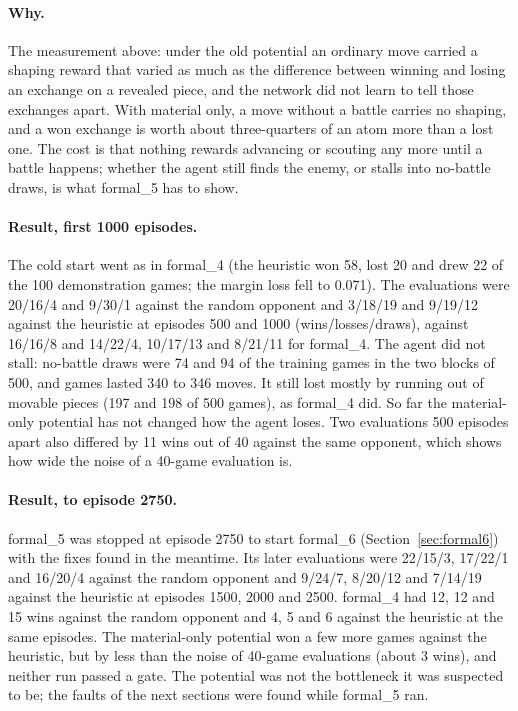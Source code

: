 \paragraph{Why.} The measurement above: under the old potential an ordinary move carried a
shaping reward that varied as much as the difference between winning and losing an exchange on a
revealed piece, and the network did not learn to tell those exchanges apart. With material only,
a move without a battle carries no shaping, and a won exchange is worth about three-quarters of
an atom more than a lost one. The cost is that nothing rewards advancing or scouting any more
until a battle happens; whether the agent still finds the enemy, or stalls into no-battle draws,
is what formal\_5 has to show.

\paragraph{Result, first 1000 episodes.} The cold start went as in formal\_4 (the heuristic won 58,
lost 20 and drew 22 of the 100 demonstration games; the margin loss fell to 0.071). The
evaluations were 20/16/4 and 9/30/1 against the random opponent and 3/18/19 and 9/19/12 against
the heuristic at episodes 500 and 1000 (wins/losses/draws), against 16/16/8 and 14/22/4, 10/17/13
and 8/21/11 for formal\_4. The agent did not stall: no-battle draws were 74 and 94 of the
training games in the two blocks of 500, and games lasted 340 to 346 moves. It still lost
mostly by running out of movable pieces (197 and 198 of 500 games), as formal\_4 did. So far the
material-only potential has not changed how the agent loses. Two evaluations 500 episodes apart
also differed by 11 wins out of 40 against the same opponent, which shows how wide the noise of a
40-game evaluation is.

\paragraph{Result, to episode 2750.} formal\_5 was stopped at episode 2750 to start formal\_6
(Section~\ref{sec:formal6}) with the fixes found in the meantime. Its later evaluations were
22/15/3, 17/22/1 and 16/20/4 against the random opponent and 9/24/7, 8/20/12 and 7/14/19 against
the heuristic at episodes 1500, 2000 and 2500. formal\_4 had 12, 12 and 15 wins against the random
opponent and 4, 5 and 6 against the heuristic at the same episodes. The material-only potential
won a few more games against the heuristic, but by less than the noise of 40-game evaluations
(about 3 wins), and neither run passed a gate. The potential was not the bottleneck it was
suspected to be; the faults of the next sections were found while formal\_5 ran.

